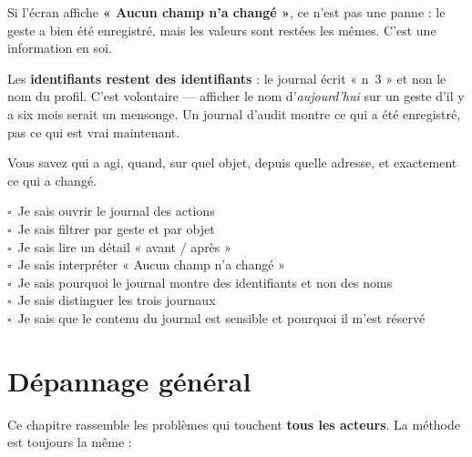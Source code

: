 \documentclass[11pt,a4paper]{report}
\newcommand{\case}{$\square$~}
\begin{document}
\begin{astuce}
Si l'écran affiche \textbf{« Aucun champ n'a changé »}, ce n'est pas une panne :
le geste a bien été enregistré, mais les valeurs sont restées les mêmes. C'est
une information en soi.
\end{astuce}

\begin{attention}
Les \textbf{identifiants restent des identifiants} : le journal écrit « n\textdegree~3 »
et non le nom du profil. C'est volontaire — afficher le nom d'\emph{aujourd'hui}
sur un geste d'il y a six mois serait un mensonge. Un journal d'audit montre ce
qui a été enregistré, pas ce qui est vrai maintenant.
\end{attention}

\begin{resultat}
Vous savez qui a agi, quand, sur quel objet, depuis quelle adresse, et
exactement ce qui a changé.
\end{resultat}

\begin{checklist}
\case Je sais ouvrir le journal des actions\\
\case Je sais filtrer par geste et par objet\\
\case Je sais lire un détail « avant / après »\\
\case Je sais interpréter « Aucun champ n'a changé »\\
\case Je sais pourquoi le journal montre des identifiants et non des noms\\
\case Je sais distinguer les trois journaux\\
\case Je sais que le contenu du journal est sensible et pourquoi il m'est réservé
\end{checklist}

\chapter{Dépannage général}
\label{ch:depannage}

Ce chapitre rassemble les problèmes qui touchent \textbf{tous les acteurs}. La
méthode est toujours la même :
\end{document}
